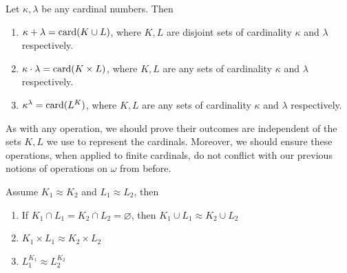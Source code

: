 \begin{definition}
    Let $\kappa, \lambda$ be any cardinal numbers. Then 

    \begin{enumerate}[label=(\roman*)]
        \item $\kappa + \lambda = \operatorname{card}(K \cup L)$, where $K,L$ are disjoint sets of cardinality $\kappa$ and $\lambda$ respectively. 
        \item $\kappa \cdot \lambda = \operatorname{card}(K \times L)$, where $K,L$ are any sets of cardinality $\kappa$ and $\lambda$ respectively. 
        \item $\kappa^\lambda = \operatorname{card}(L^K)$, where $K,L$ are any sets of cardinality $\kappa$ and $\lambda$ respectively. 
    \end{enumerate}
\end{definition}

As with any operation, we should prove their outcomes are independent of the sets $K,L$ we use to represent the cardinals. Moreover, we should ensure these operations, when applied to finite cardinals, do not conflict with our previous notions of operations on $\omega$ from before.

\begin{theorem}
    Assume $K_1 \approx K_2$ and $L_1 \approx L_2$, then 

    \begin{enumerate}[label=(\alph*)]
        \item If $K_1 \cap L_1 = K_2 \cap L_2 = \varnothing$, then $K_1 \cup L_1 \approx K_2 \cup L_2$
        \item $K_1 \times L_1 \approx K_2 \times L_2$
        \item $L_1^{K_1} \approx L_2^{K_2}$
    \end{enumerate}
\end{theorem}

